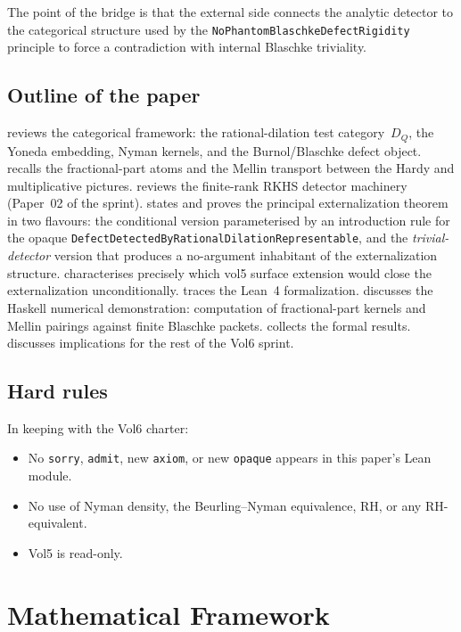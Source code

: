 \documentclass[12pt]{article}
\theoremstyle{plain}
\theoremstyle{definition}
\theoremstyle{remark}
\newcommand{\DQ}{D_{Q}}
\begin{document}
The point of the bridge is that the external side connects the analytic
detector to the categorical structure used by the
\texttt{NoPhantomBlaschkeDefectRigidity} principle to force a
contradiction with internal Blaschke triviality.

\subsection{Outline of the paper}

 reviews the categorical framework: the
rational-dilation test category~$\DQ$, the Yoneda embedding, Nyman
kernels, and the Burnol/Blaschke defect object.  
recalls the fractional-part atoms and the Mellin transport between the
Hardy and multiplicative pictures.   reviews the
finite-rank RKHS detector machinery (Paper~02 of the sprint).
 states and proves the principal
externalization theorem in two flavours: the conditional version
parameterised by an introduction rule for the opaque
\texttt{DefectDetectedByRationalDilationRepresentable}, and the
\emph{trivial-detector} version that produces a no-argument inhabitant
of the externalization structure.   characterises
precisely which vol5 surface extension would close the
externalization unconditionally.   traces the Lean~4
formalization.   discusses the Haskell numerical
demonstration: computation of fractional-part kernels and Mellin
pairings against finite Blaschke packets.  
collects the formal results.   discusses
implications for the rest of the Vol6 sprint.

\subsection{Hard rules}

In keeping with the Vol6 charter:
\begin{itemize}
  \item No \texttt{sorry}, \texttt{admit}, new \texttt{axiom}, or new
    \texttt{opaque} appears in this paper's Lean module.
  \item No use of Nyman density, the Beurling--Nyman equivalence, RH,
    or any RH-equivalent.
  \item Vol5 is read-only.
\end{itemize}

\section{Mathematical Framework}
\label{sec:framework}
\end{document}
